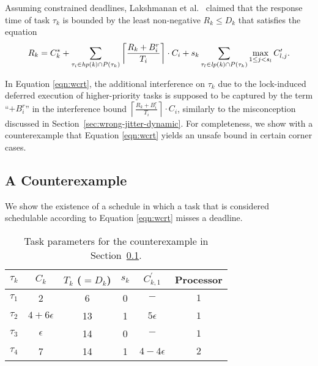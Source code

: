 Assuming constrained deadlines, Lakshmanan et al.~\cite{lakshmanan-2009} claimed that the response time of task $\tau_k$ is bounded by the least non-negative $R_k \leq D_k$ that satisfies the equation
\begin{equation}
\label{eqn:wcrt}
R_k = C_k^{\ast} + \sum_{\tau_i \in \mathit{hp(k)} \cap P(\tau_k)} \left \lceil \frac{R_k + B_i^r}{T_i} \right \rceil \cdot C_i + s_k \sum_{\tau_l \in \mathit{lp(k)} \cap P(\tau_k)} \max_{1 \leq j < s_l} C_{l,j}^{\prime}.
\end{equation}



In Equation \ref{eqn:wcrt}, the additional interference on $\tau_k$ due to the lock-induced deferred execution of higher-priority tasks is supposed to be captured by the term ``$+ B^r_i$'' in the interference bound  $\left \lceil \frac{R_k + B_i^r}{T_i} \right \rceil \cdot C_i$,  similarly to the misconception discussed in Section~\ref{sec:wrong-jitter-dynamic}. For completeness, we show with a counterexample that Equation \ref{eqn:wcrt} yields an unsafe bound in certain corner cases.

\subsection{A Counterexample}
\label{sec:counterexample}

We show the existence of a schedule in which a task that is considered schedulable according to Equation \ref{eqn:wcrt} misses a deadline.

%

\begin{table}[t]
\centering
    \begin{tabular}{|c|c|c|c|c|c|} 
 \hline
        $\tau_k$ & $C_k$ & $T_k$ ($= D_k$) & $s_k$ & $C_{k,1}^{\prime}$ & Processor\\
        \hline
        $\tau_1$ & 2             & 6  & 0 & $-$ & $1$\\ 
        $\tau_2$ & $4+6\epsilon$ & 13 & 1 & $5\epsilon$& $1$\\
        $\tau_3$ & $\epsilon$    & 14 & 0 & $-$ & $1$\\
        $\tau_4$ & 7             & 14 & 1 & $4-4\epsilon$ & $2$\\ 
        \hline
    \end{tabular}
    \caption{Task parameters for the counterexample in Section~\ref{sec:counterexample}.}
    \label{table:parameters}
\end{table}

